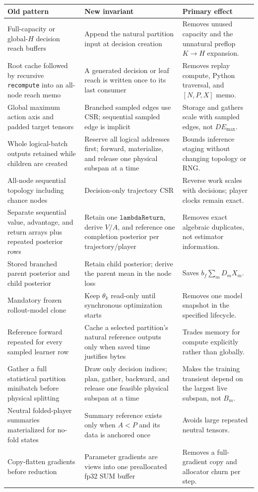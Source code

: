 \documentclass[10pt,a4paper]{article}
\begin{document}
\begin{longtable}{p{}p{}p{}}
\toprule
Old pattern & New invariant & Primary effect \\
\midrule
\endhead
Full-capacity or global-$H$ decision reach buffers & Append the natural partition input at decision creation & Removes unused capacity and the unnatural preflop $K\to H$ expansion. \\
Root cache followed by recursive \texttt{recompute} into an all-node reach memo & A generated decision or leaf reach is written once to its last consumer & Removes replay compute, Python traversal, and $[N,P,X]$ memo. \\
Global maximum action axis and padded target tensors & Branched sampled edges use CSR; sequential sampled edge is implicit & Storage and gathers scale with sampled edges, not $D E_{\max}$. \\
Whole logical-batch outputs retained while children are created & Reserve all logical addresses first; forward, materialize, and release one physical subspan at a time & Bounds inference staging without changing topology or RNG. \\
All-node sequential topology including chance nodes & Decision-only trajectory CSR & Reverse work scales with decisions; player clocks remain exact. \\
Separate sequential value, advantage, and return arrays plus repeated posterior rows & Retain one $\mathtt{lambdaReturn}$, derive $V/A$, and reference one completion posterior per trajectory/player & Removes exact algebraic duplicates, not estimator information. \\
Stored branched parent posterior and child posterior & Retain child posterior; derive the parent mean in the node loss & Saves $b_f\sum_mD_mX_m$. \\
Mandatory frozen rollout-model clone & Keep $\theta_k$ read-only until synchronous optimization starts & Removes one model snapshot in the specified lifecycle. \\
Reference forward repeated for every sampled learner row & Cache a selected partition's natural reference outputs only when saved time justifies bytes & Trades memory for compute explicitly rather than globally. \\
Gather a full statistical partition minibatch before physical splitting & Draw only decision indices; plan, gather, backward, and release one feasible physical subspan at a time & Makes the training transient depend on the largest live subspan, not $B_m$. \\
Neutral folded-player summaries materialized for no-fold states & Summary reference exists only when $A<P$ and its data is anchored once & Avoids large repeated neutral tensors. \\
Copy-flatten gradients before reduction & Parameter gradients are views into one preallocated fp32 SUM buffer & Removes a full-gradient copy and allocator churn per step. \\
\bottomrule
\end{longtable}
\end{document}
